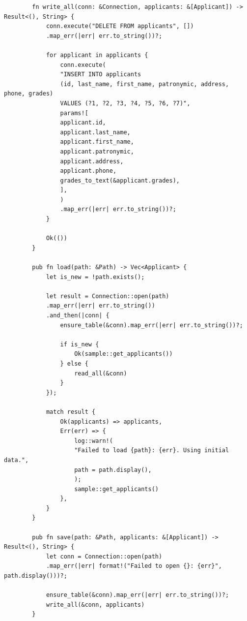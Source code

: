 \documentclass[14pt, a4paper]{extreport}
\begin{document}
\begin{verbatim}
		fn write_all(conn: &Connection, applicants: &[Applicant]) -> Result<(), String> {
			conn.execute("DELETE FROM applicants", [])
			.map_err(|err| err.to_string())?;
			
			for applicant in applicants {
				conn.execute(
				"INSERT INTO applicants
				(id, last_name, first_name, patronymic, address, phone, grades)
				VALUES (?1, ?2, ?3, ?4, ?5, ?6, ?7)",
				params![
				applicant.id,
				applicant.last_name,
				applicant.first_name,
				applicant.patronymic,
				applicant.address,
				applicant.phone,
				grades_to_text(&applicant.grades),
				],
				)
				.map_err(|err| err.to_string())?;
			}
			
			Ok(())
		}
		
		pub fn load(path: &Path) -> Vec<Applicant> {
			let is_new = !path.exists();
			
			let result = Connection::open(path)
			.map_err(|err| err.to_string())
			.and_then(|conn| {
				ensure_table(&conn).map_err(|err| err.to_string())?;
				
				if is_new {
					Ok(sample::get_applicants())
				} else {
					read_all(&conn)
				}
			});
			
			match result {
				Ok(applicants) => applicants,
				Err(err) => {
					log::warn!(
					"Failed to load {path}: {err}. Using initial data.",
					path = path.display(),
					);
					sample::get_applicants()
				},
			}
		}
		
		pub fn save(path: &Path, applicants: &[Applicant]) -> Result<(), String> {
			let conn = Connection::open(path)
			.map_err(|err| format!("Failed to open {}: {err}", path.display()))?;
			
			ensure_table(&conn).map_err(|err| err.to_string())?;
			write_all(&conn, applicants)
		}
	\end{verbatim}
\end{document}
